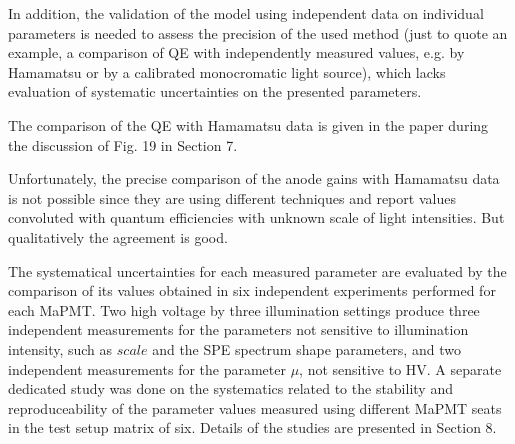 \documentclass[11pt]{report}
\begin{document}
\begin{tcolorbox}[enlarge top by=2em,colbacktitle=blue!60!white,colframe=black!80!white,left=0pt,right=0pt,top=0pt,bottom=0pt,boxrule=0.3pt,title=\bfseries2.12]
In addition, the validation of the model using independent data on individual parameters is needed to assess the precision of the used method (just to quote an example, a comparison of QE with independently measured values, e.g. by Hamamatsu or by a calibrated monocromatic light source), which lacks evaluation of systematic uncertainties on the presented parameters.
\end{tcolorbox}


The comparison of the QE with Hamamatsu data is given in the paper during the discussion of Fig. 19 in Section 7.


Unfortunately, the precise comparison of the anode gains with Hamamatsu data is not possible since they are using different techniques and report values convoluted with quantum efficiencies with unknown scale of light intensities. But qualitatively the agreement is good.

The systematical uncertainties for each measured parameter are evaluated by the comparison of its values obtained in six independent experiments performed for each MaPMT. Two high voltage by three illumination settings produce three independent measurements for the parameters not sensitive to illumination intensity, such as $scale$ and the SPE spectrum shape parameters, and two independent measurements for the parameter $\mu$, not sensitive to HV. A separate dedicated study was done on the systematics related to the stability and reproduceability of the parameter values measured using different MaPMT seats in the test setup matrix of six. Details of the studies are presented in Section 8.



\clearpage




\begin{tcolorbox}[enlarge top by=2em,colbacktitle=red!60!white,colframe=black!80!white,left=0pt,right=0pt,top=0pt,bottom=0pt,boxrule=0.3pt,title=\bfseries Addition 1]
\end{tcolorbox}
\end{document}
